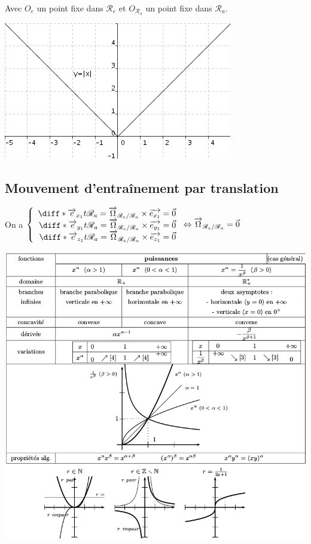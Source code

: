 \documentclass[a4paper,10pt]{book} %
\begin{document}
Avec $O_{e}$ un point fixe dans $\mathcal{R}_e$ et $O_{\mathcal{R}_a}$ un point fixe dans $\mathcal{R}_a$.

\begin{center}\includegraphics[scale=0.4]{images/004.png}\end{center}

\subsection{Mouvement d’entraînement par translation}
On a \phantom{aaa}$\left\{ \begin{array}{rcl}
\diff*{\overrightarrow{e}_{x_1}}{t}{\mathcal{R}_a}=\overrightarrow{\Omega}_{\mathcal{R}_e/\mathcal{R}_a}\times\overrightarrow{e_{x_1}}=\vec{0}\\
\diff*{\overrightarrow{e}_{y_1}}{t}{\mathcal{R}_a}=\overrightarrow{\Omega}_{\mathcal{R}_e/\mathcal{R}_a}\times\overrightarrow{e_{y_1}}=\vec{0}\\
\diff*{\overrightarrow{e}_{z_1}}{t}{\mathcal{R}_a}=\overrightarrow{\Omega}_{\mathcal{R}_e/\mathcal{R}_a}\times\overrightarrow{e_{z_1}}=\vec{0}
\end{array}  \right. \Leftrightarrow \overrightarrow{\Omega}_{\mathcal{R}_e/\mathcal{R}_a}=\vec{0}$

\begin{center}\includegraphics[scale=0.25]{images/005.png}\end{center}
\end{document}
